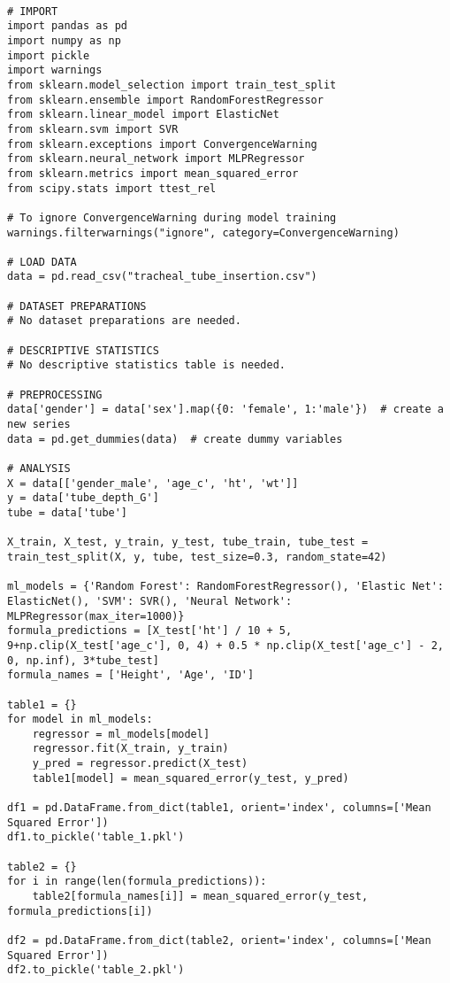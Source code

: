 \documentclass[11pt]{article}
\begin{document}
\begin{verbatim}

# IMPORT
import pandas as pd
import numpy as np
import pickle
import warnings
from sklearn.model_selection import train_test_split
from sklearn.ensemble import RandomForestRegressor
from sklearn.linear_model import ElasticNet
from sklearn.svm import SVR
from sklearn.exceptions import ConvergenceWarning
from sklearn.neural_network import MLPRegressor
from sklearn.metrics import mean_squared_error
from scipy.stats import ttest_rel

# To ignore ConvergenceWarning during model training
warnings.filterwarnings("ignore", category=ConvergenceWarning)

# LOAD DATA
data = pd.read_csv("tracheal_tube_insertion.csv")

# DATASET PREPARATIONS
# No dataset preparations are needed.

# DESCRIPTIVE STATISTICS
# No descriptive statistics table is needed.

# PREPROCESSING 
data['gender'] = data['sex'].map({0: 'female', 1:'male'})  # create a new series
data = pd.get_dummies(data)  # create dummy variables

# ANALYSIS
X = data[['gender_male', 'age_c', 'ht', 'wt']]
y = data['tube_depth_G']
tube = data['tube']

X_train, X_test, y_train, y_test, tube_train, tube_test = train_test_split(X, y, tube, test_size=0.3, random_state=42)

ml_models = {'Random Forest': RandomForestRegressor(), 'Elastic Net': ElasticNet(), 'SVM': SVR(), 'Neural Network': MLPRegressor(max_iter=1000)}
formula_predictions = [X_test['ht'] / 10 + 5, 9+np.clip(X_test['age_c'], 0, 4) + 0.5 * np.clip(X_test['age_c'] - 2, 0, np.inf), 3*tube_test]
formula_names = ['Height', 'Age', 'ID']

table1 = {}
for model in ml_models:
    regressor = ml_models[model]
    regressor.fit(X_train, y_train)
    y_pred = regressor.predict(X_test)
    table1[model] = mean_squared_error(y_test, y_pred)
    
df1 = pd.DataFrame.from_dict(table1, orient='index', columns=['Mean Squared Error']) 
df1.to_pickle('table_1.pkl') 

table2 = {}
for i in range(len(formula_predictions)):
    table2[formula_names[i]] = mean_squared_error(y_test, formula_predictions[i]) 

df2 = pd.DataFrame.from_dict(table2, orient='index', columns=['Mean Squared Error'])
df2.to_pickle('table_2.pkl')


\end{verbatim}
\end{document}
